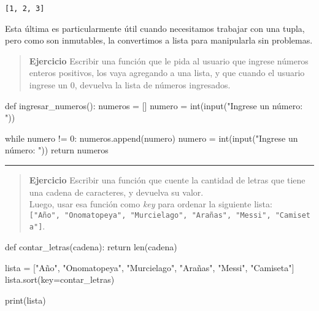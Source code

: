 \documentclass[
  letterpaper,
  DIV=11,
  numbers=noendperiod]{scrreprt}
\newenvironment{Shaded}{\begin{snugshade}}{\end{snugshade}}
\newcommand{\BuiltInTok}[1]{\textcolor[rgb]{0.00,0.23,0.31}{#1}}
\newcommand{\ControlFlowTok}[1]{\textcolor[rgb]{0.00,0.23,0.31}{#1}}
\newcommand{\DecValTok}[1]{\textcolor[rgb]{0.68,0.00,0.00}{#1}}
\newcommand{\KeywordTok}[1]{\textcolor[rgb]{0.00,0.23,0.31}{#1}}
\newcommand{\NormalTok}[1]{\textcolor[rgb]{0.00,0.23,0.31}{#1}}
\newcommand{\OperatorTok}[1]{\textcolor[rgb]{0.37,0.37,0.37}{#1}}
\newcommand{\StringTok}[1]{\textcolor[rgb]{0.13,0.47,0.30}{#1}}
\begin{document}
\begin{verbatim}
[1, 2, 3]
\end{verbatim}

Esta última es particularmente útil cuando necesitamos trabajar con una
tupla, pero como son inmutables, la convertimos a lista para manipularla
sin problemas.

\begin{quote}
\textbf{Ejercicio} Escribir una función que le pida al usuario que
ingrese números enteros positivos, los vaya agregando a una lista, y que
cuando el usuario ingrese un 0, devuelva la lista de números ingresados.
\end{quote}

\begin{Shaded}
\begin{Highlighting}[]
\KeywordTok{def}\NormalTok{ ingresar\_numeros():}
\NormalTok{    numeros }\OperatorTok{=}\NormalTok{ []}
\NormalTok{    numero }\OperatorTok{=} \BuiltInTok{int}\NormalTok{(}\BuiltInTok{input}\NormalTok{(}\StringTok{"Ingrese un número: "}\NormalTok{))}

    \ControlFlowTok{while}\NormalTok{ numero }\OperatorTok{!=} \DecValTok{0}\NormalTok{:}
\NormalTok{        numeros.append(numero)}
\NormalTok{        numero }\OperatorTok{=} \BuiltInTok{int}\NormalTok{(}\BuiltInTok{input}\NormalTok{(}\StringTok{"Ingrese un número: "}\NormalTok{))}
    \ControlFlowTok{return}\NormalTok{ numeros}
\end{Highlighting}
\end{Shaded}

\hfill\break

\begin{center}\rule{0.5\linewidth}{0.5pt}\end{center}

\hfill\break

\begin{quote}
\textbf{Ejercicio} Escribir una función que cuente la cantidad de letras
que tiene una cadena de caracteres, y devuelva su valor.\\
Luego, usar esa función como \emph{key} para ordenar la siguiente lista:
\texttt{{[}"Año",\ "Onomatopeya",\ "Murcielago",\ "Arañas",\ "Messi",\ "Camiseta"{]}}.
\end{quote}

\begin{Shaded}
\begin{Highlighting}[]
\KeywordTok{def}\NormalTok{ contar\_letras(cadena):}
    \ControlFlowTok{return} \BuiltInTok{len}\NormalTok{(cadena)}

\NormalTok{lista }\OperatorTok{=}\NormalTok{ [}\StringTok{"Año"}\NormalTok{, }\StringTok{"Onomatopeya"}\NormalTok{, }\StringTok{"Murcielago"}\NormalTok{, }\StringTok{"Arañas"}\NormalTok{, }\StringTok{"Messi"}\NormalTok{, }\StringTok{"Camiseta"}\NormalTok{]}
\NormalTok{lista.sort(key}\OperatorTok{=}\NormalTok{contar\_letras)}

\BuiltInTok{print}\NormalTok{(lista)}
\end{Highlighting}
\end{Shaded}
\end{document}
